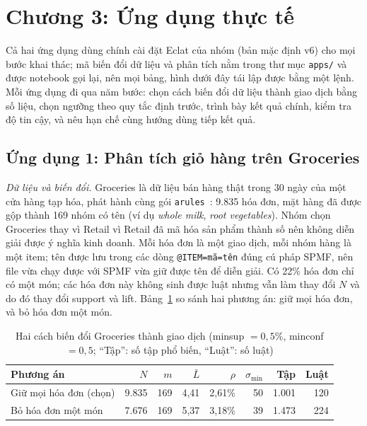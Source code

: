 \section{Chương 3: Ứng dụng thực tế}
\label{sec:ung-dung}

Cả hai ứng dụng dùng chính cài đặt Eclat của nhóm (bản mặc định v6) cho mọi bước khai thác; mã biến đổi dữ liệu và phân tích nằm trong thư mục \texttt{apps/} và được notebook gọi lại, nên mọi bảng, hình dưới đây tái lập được bằng một lệnh. Mỗi ứng dụng đi qua năm bước: chọn cách biến đổi dữ liệu thành giao dịch bằng số liệu, chọn ngưỡng theo quy tắc định trước, trình bày kết quả chính, kiểm tra độ tin cậy, và nêu hạn chế cùng hướng dùng tiếp kết quả.

\subsection{Ứng dụng 1: Phân tích giỏ hàng trên Groceries}
\label{sec:groceries}

\emph{Dữ liệu và biến đổi.} Groceries là dữ liệu bán hàng thật trong 30 ngày của một cửa hàng tạp hóa, phát hành cùng gói \texttt{arules}~\cite{hahsler2005arules}: 9.835 hóa đơn, mặt hàng đã được gộp thành 169 nhóm có tên (ví dụ \emph{whole milk}, \emph{root vegetables}). Nhóm chọn Groceries thay vì Retail vì Retail đã mã hóa sản phẩm thành số nên không diễn giải được ý nghĩa kinh doanh. Mỗi hóa đơn là một giao dịch, mỗi nhóm hàng là một item; tên được lưu trong các dòng \texttt{@ITEM=mã=tên} đúng cú pháp SPMF, nên file vừa chạy được với SPMF vừa giữ được tên để diễn giải. Có 22\% hóa đơn chỉ có một món; các hóa đơn này không sinh được luật nhưng vẫn làm thay đổi $N$ và do đó thay đổi support và lift. Bảng~\ref{tab:b08} so sánh hai phương án: giữ mọi hóa đơn, và bỏ hóa đơn một món.

\begin{table}[t]
\caption{Hai cách biến đổi Groceries thành giao dịch (minsup $= 0{,}5\%$, minconf $= 0{,}5$; ``Tập'': số tập phổ biến, ``Luật'': số luật)}
\label{tab:b08}
\centering
\footnotesize
\setlength{\tabcolsep}{3pt}
\begin{tabular}{@{}p{1.85cm}rrrrrrr@{}}
\toprule
Phương án & $N$ & $m$ & $\bar{L}$ & $\rho$ & $\sigma_{\min}$ & Tập & Luật \\
\midrule
Giữ mọi hóa đơn (chọn) & 9.835 & 169 & 4,41 & 2,61\% & 50 & 1.001 & 120 \\
Bỏ hóa đơn một món & 7.676 & 169 & 5,37 & 3,18\% & 39 & 1.473 & 224 \\
\bottomrule
\end{tabular}
\end{table}

